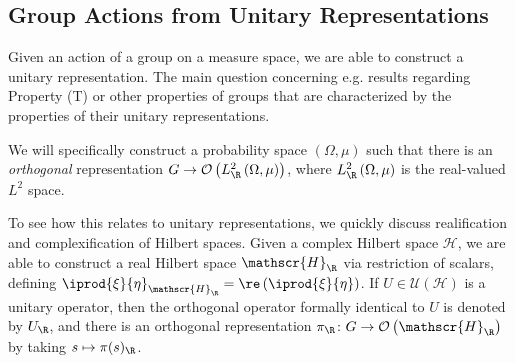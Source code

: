 \documentclass[10pt]{mypackage}
\begin{document}
\subsection{Group Actions from Unitary Representations}%
Given an action of a group on a measure space, we are able to construct a unitary representation. The main question concerning e.g. results regarding Property (T) or other properties of groups that are characterized by the properties of their unitary representations.

We will specifically construct a probability space $\left( \Omega,\mu \right)$ such that there is an \textit{orthogonal} representation $G\to \mathcal{O}\left( L_{\R}^2\left( \Omega,\mu \right) \right)$, where $L^2_{\R}\left( \Omega,\mu \right)$ is the real-valued $L^2$ space.

To see how this relates to unitary representations, we quickly discuss realification and complexification of Hilbert spaces. Given a complex Hilbert space $ \mathscr{H} $, we are able to construct a real Hilbert space $\mathscr{H}_{\R}$ via restriction of scalars, defining $ \iprod{\xi}{\eta}_{\mathscr{H}_{\R}} = \re \left( \iprod{\xi}{\eta} \right) $. If $U\in \mathcal{U}\left( \mathscr{H} \right)$ is a unitary operator, then the orthogonal operator formally identical to $U$ is denoted by $U_{\R}$, and there is an orthogonal representation $\pi_{\R}\colon G\to \mathcal{O}\left( \mathscr{H}_{\R} \right)$ by taking $s\mapsto \pi(s)_{\R}$.
\end{document}
